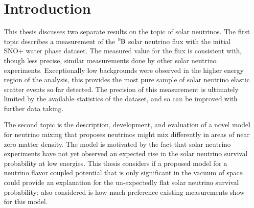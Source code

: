 
\chapter{Introduction}

\ifpdf
    \graphicspath{{physics/figures/PNG/}{physics/figures/PDF/}{physics/figures/}}
\else
    \graphicspath{{physics/figures/EPS/}{physics/figures/}}
\fi

This thesis discusses two separate results on the topic of solar neutrinos.
The first topic describes a measurement of the $\ce{^{8}B}$ solar
neutrino flux with the initial SNO+ water phase dataset.
The measured value for the flux is consistent with, though less precise, similar measurements
done by other solar neutrino experiments.
Exceptionally low backgrounds were observed in the higher energy region of the
analysis, this provides the most pure sample of solar neutrino elastic scatter 
events so far detected.
The precision of this measurement is ultimately limited by the available
statistics of the dataset, and so can be improved with further data taking.

The second topic is the description, development, and evaluation of a novel
model for neutrino mixing that proposes neutrinos might mix differently in
areas of near zero matter density.
The model is motivated by the fact that solar neutrino experiments have
not yet observed an expected rise in the solar neutrino survival probability
at low energies.
This thesis considers if a proposed model for a neutrino flavor coupled potential
that is only significant in the vacuum of space
could provide an explanation for the un-expectedly flat solar neutrino
survival probability;
also considered is how much preference existing measurements show
for this model.




